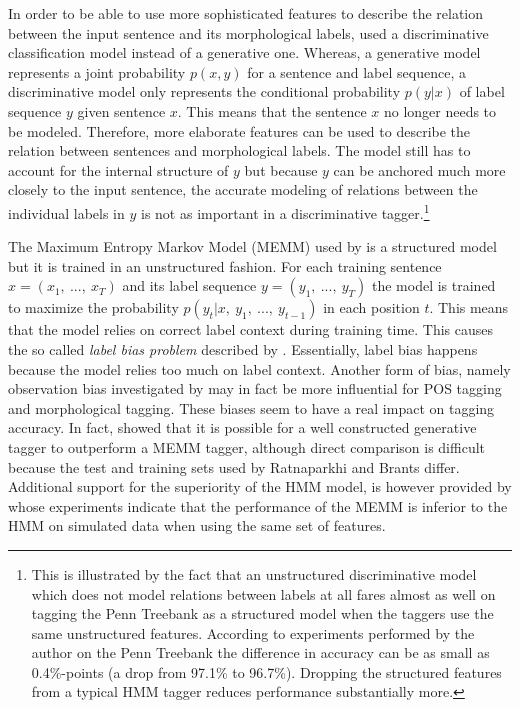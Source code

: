 In order to be able to use more sophisticated features to describe the
relation between the input sentence and its morphological labels,
\cite{Ratnaparkhi1997} used a discriminative classification model
instead of a generative one. Whereas, a generative model represents a
joint probability $p(x,y)$ for a sentence and label sequence, a
discriminative model only represents the conditional probability
$p(y|x)$ of label sequence $y$ given sentence $x$. This means that the
sentence $x$ no longer needs to be modeled. Therefore, more elaborate
features can be used to describe the relation between sentences and
morphological labels. The model still has to account for the internal
structure of $y$ but because $y$ can be anchored much more closely to
the input sentence, the accurate modeling of relations between the
individual labels in $y$ is not as important in a discriminative
tagger.\footnote{This is illustrated by the fact that an unstructured
  discriminative model which does not model relations between labels
  at all fares almost as well on tagging the Penn Treebank as a
  structured model when the taggers use the same unstructured
  features. According to experiments performed by the author on the
  Penn Treebank the difference in accuracy can be as small as
  0.4\%-points (a drop from 97.1\% to 96.7\%). Dropping the structured
  features from a typical HMM tagger reduces performance substantially
  more.}

The Maximum Entropy Markov Model (MEMM) used by \cite{Ratnaparkhi1997} is a
structured model but it is trained in an unstructured fashion. For
each training sentence $x = (x_1,\ ...,\ x_T)$ and its label sequence
$y = (y_1,\ ...,\ y_T)$ the model is trained to maximize the
probability $p(y_t| x,\ y_1,\ ...,\ y_{t - 1})$
in each position $t$. This means that the model relies on correct
label context during training time. This causes the so called {\it
  label bias problem} described by \cite{Lafferty2001}. Essentially,
label bias happens because the model relies too much on label
context. Another form of bias, namely observation bias investigated by
\cite{Klein2002} may in fact be more influential for POS tagging and
morphological tagging. These biases seem to have a real impact on
tagging accuracy. In fact, \cite{Brants2000} showed that it is
possible for a well constructed generative tagger to outperform a MEMM
tagger, although direct comparison is difficult because the test and
training sets used by Ratnaparkhi and Brants differ. Additional
support for the superiority of the HMM model, is however provided by
\cite{Lafferty2001} whose experiments indicate that the performance of
the MEMM is inferior to the HMM on simulated data when using the same
set of features.

